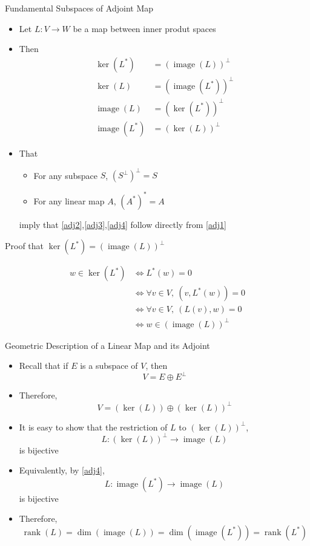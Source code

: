 \documentclass[usenames,dvipsnames,10pt]{beamer}
\newcommand\rank{\operatorname{rank}}
\newcommand\image{\operatorname{image}}
\begin{document}
\begin{frame}
  {Fundamental Subspaces of Adjoint Map}

  \begin{itemize}
  \item Let $L: V \rightarrow W$ be a map between inner produt spaces
  \item Then
    \begin{align}
      \ker(L^*) &= (\image(L))^\perp \label{adj1}\\
      \ker(L) &= (\image(L^*))^\perp \label{adj2}\\
      \image(L) &= (\ker(L^*))^\perp \label{adj3}\\
      \image(L^*) &= (\ker(L))^\perp \label{adj4}
    \end{align}
  \item That
    \begin{itemize}
    \item For any subspace $S$, $(S^\perp)^\perp = S$
    \item For any linear map $A$, $(A^*)^* = A$
    \end{itemize}
    imply that \eqref{adj2},\eqref{adj3},\eqref{adj4} follow directly from \eqref{adj1}
  \end{itemize}
\end{frame}

\begin{frame}
  {Proof that $\ker(L^*) = (\image(L))^\perp$}

  \begin{align*}
    w \in \ker(L^*) &\iff L^*(w) = 0\\
                    &\iff \forall v \in V,\ (v,L^*(w))= 0\\
                    &\iff \forall v \in V,\ (L(v),w) = 0\\
                    &\iff w \in (\image(L))^\perp
  \end{align*}
\end{frame}

\begin{frame}
  {Geometric Description of a Linear Map and its Adjoint}

  \begin{itemize}
  \item Recall that if $E$ is a subspace of $V$, then
    \[
      V = E\oplus E^\perp
    \]
  \item Therefore,
    \[
      V = (\ker(L)) \oplus (\ker(L))^\perp
    \]
  \item It is easy to show that the restriction of $L$ to $(\ker(L))^\perp$,
    \[
      L: (\ker(L))^\perp \rightarrow \image(L)
    \]
    is bijective
  \item Equivalently, by \eqref{adj4},
    \[
      L: \image(L^*) \rightarrow \image(L)
    \]
    is bijective
  \item Therefore,
    \[
      \rank(L) = \dim(\image(L)) = \dim(\image(L^*)) = \rank(L^*)
    \]
  \end{itemize}
\end{frame}
\end{document}

